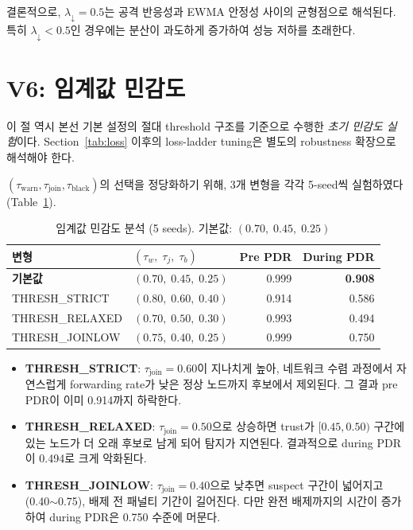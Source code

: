 \documentclass[12pt,a4paper]{article}
\begin{document}
결론적으로, $\lambda_\downarrow=0.5$는 공격 반응성과 EWMA 안정성 사이의 균형점으로 해석된다.
특히 $\lambda_\downarrow < 0.5$인 경우에는 분산이 과도하게 증가하여 성능 저하를 초래한다.

\section{V6: 임계값 민감도}

이 절 역시 본선 기본 설정의 절대 threshold 구조를 기준으로 수행한
\emph{초기 민감도 실험}이다. Section~\ref{tab:loss} 이후의 loss-ladder tuning은
별도의 robustness 확장으로 해석해야 한다.

$(\tau_\text{warn}, \tau_\text{join}, \tau_\text{black})$의 선택을 정당화하기 위해,
3개 변형을 각각 5-seed씩 실험하였다(Table~\ref{tab:thresh}).

\begin{table}[t]
  \centering
  \caption{임계값 민감도 분석 (5 seeds). 기본값: $(0.70,\;0.45,\;0.25)$}
  \label{tab:thresh}
  \begin{tabular}{lp{2.2cm}rr}
    \toprule
    변형 & $(\tau_w,\;\tau_j,\;\tau_b)$ & Pre PDR & During PDR \\
    \midrule
    \textbf{기본값} & $(0.70,\;0.45,\;0.25)$ & 0.999 & \textbf{0.908} \\
    THRESH\_STRICT  & $(0.80,\;0.60,\;0.40)$ & 0.914 & 0.586 \\
    THRESH\_RELAXED & $(0.70,\;0.50,\;0.30)$ & 0.993 & 0.494 \\
    THRESH\_JOINLOW & $(0.75,\;0.40,\;0.25)$ & 0.999 & 0.750 \\
    \bottomrule
  \end{tabular}
\end{table}

\begin{itemize}
  \item \textbf{THRESH\_STRICT}: $\tau_\text{join}=0.60$이 지나치게 높아,
  네트워크 수렴 과정에서 자연스럽게 forwarding rate가 낮은 정상 노드까지
  후보에서 제외된다. 그 결과 pre PDR이 이미 0.914까지 하락한다.
  \item \textbf{THRESH\_RELAXED}: $\tau_\text{join}=0.50$으로 상승하면
  trust가 $[0.45,0.50)$ 구간에 있는 노드가 더 오래 후보로 남게 되어 탐지가 지연된다.
  결과적으로 during PDR이 0.494로 크게 악화된다.
  \item \textbf{THRESH\_JOINLOW}: $\tau_\text{join}=0.40$으로 낮추면
  suspect 구간이 넓어지고(0.40$\sim$0.75), 배제 전 패널티 기간이 길어진다.
  다만 완전 배제까지의 시간이 증가하여 during PDR은 0.750 수준에 머문다.
\end{itemize}
\end{document}
